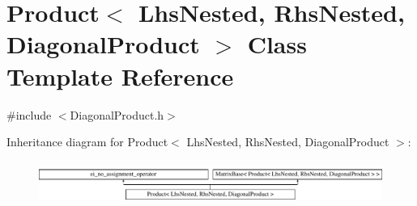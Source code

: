 \hypertarget{class_product_3_01_lhs_nested_00_01_rhs_nested_00_01_diagonal_product_01_4}{\section{Product$<$ Lhs\-Nested, Rhs\-Nested, Diagonal\-Product $>$ Class Template Reference}
\label{class_product_3_01_lhs_nested_00_01_rhs_nested_00_01_diagonal_product_01_4}
}


{\ttfamily \#include $<$Diagonal\-Product.\-h$>$}

Inheritance diagram for Product$<$ Lhs\-Nested, Rhs\-Nested, Diagonal\-Product $>$\-:\begin{figure}[H]
\begin{center}
\leavevmode
\includegraphics[height=1.379310cm]{class_product_3_01_lhs_nested_00_01_rhs_nested_00_01_diagonal_product_01_4}
\end{center}
\end{figure}

